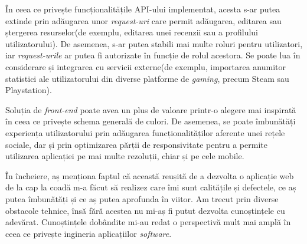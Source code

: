 \documentclass[12pt,a4paper]{report}
\begin{document}
În ceea ce privește funcționalitățile API-ului implementat, acesta s-ar putea extinde prin adăugarea unor \emph{request-uri} care permit adăugarea, editarea sau ștergerea resurselor(de exemplu, editarea unei recenzii sau a profilului utilizatorului). De asemenea, s-ar putea stabili mai multe roluri pentru utilizatori, iar \emph{request-urile} ar putea fi autorizate în funcție de rolul acestora. Se poate lua în considerare și integrarea cu servicii externe(de exemplu, importarea anumitor statistici ale utilizatorului din diverse platforme de \emph{gaming}, precum Steam sau Playstation).

Soluția de \emph{front-end} poate avea un plus de valoare printr-o alegere mai inspirată în ceea ce privește schema generală de culori. De asemenea, se poate îmbunătăți experiența utilizatorului prin adăugarea funcționalităților aferente unei rețele sociale, dar și prin optimizarea părții de responsivitate pentru a permite utilizarea aplicației pe mai multe rezoluții, chiar și pe cele mobile.

În încheiere, aș menționa faptul că această reușită de a dezvolta o aplicație web de la cap la coadă m-a făcut să realizez care îmi sunt calitățile și defectele, ce aș putea îmbunătăți și ce aș putea aprofunda în viitor. Am trecut prin diverse obstacole tehnice, însă fără acestea nu mi-aș fi putut dezvolta cunoștințele cu adevărat. Cunoștințele dobândite mi-au redat o perspectivă mult mai amplă în ceea ce privește ingineria aplicațiilor \emph{software}.
\end{document}
